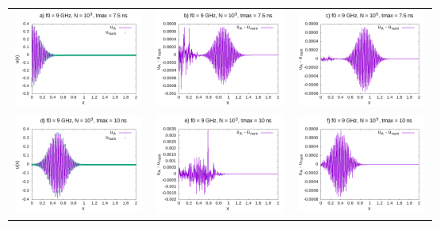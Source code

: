 \documentclass[11pt,a4paper]{report}
\begin{document}
\begin{figure}
\begin{tabular}{ccc}
  \includegraphics[width=55mm]{plots/9/mc9_3_075} &   \includegraphics[width=55mm]{plots/9/mc9_3_075_dif} &   \includegraphics[width=55mm]{plots/9/mc9_5_075_dif} \\
\includegraphics[width=55mm]{plots/9/mc9_3_10} &   \includegraphics[width=55mm]{plots/9/mc9_3_10_dif} &   \includegraphics[width=55mm]{plots/9/mc9_5_10_dif} \\

\end{tabular}
\end{figure}
\end{document}

